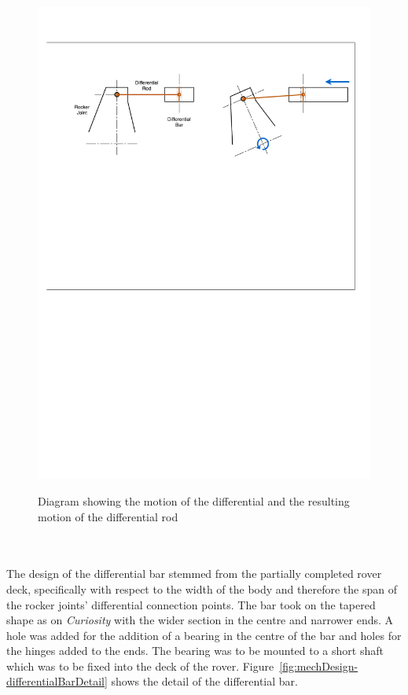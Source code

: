 \begin{figure}[H]
{        \includegraphics[clip, trim=2cm 26cm 2cm 4cm, width=0.9\linewidth]{figures/mechDesign-differentialMotionSide.pdf}
      }
      \caption[Diagram showing the motion of the differential and the resulting motion of the differential rod]{Diagram showing the motion of the differential and the resulting motion of the differential rod}
      \label{fig:mechDesign-differentialMotion}
      \end{figure}
      
      \\\\
        The design of the differential bar stemmed from the partially completed rover deck, specifically with respect to the width of the body and therefore the span of the rocker joints' differential connection points. The bar took on the tapered shape as on \textit{Curiosity} with the wider section in the centre and narrower ends. A hole was added for the addition of a bearing in the centre of the bar and holes for the hinges added to the ends. The bearing was to be mounted to a short shaft which was to be fixed into the deck of the rover. Figure~\ref{fig:mechDesign-differentialBarDetail} shows the detail of the differential bar.
        
